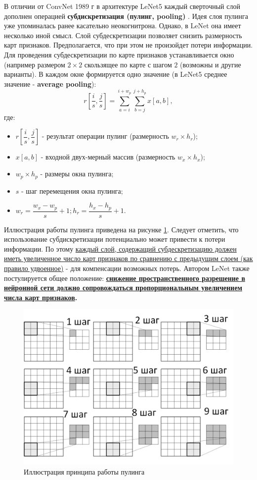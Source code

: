 \documentclass[12pt]{article}
\begin{document}
\begin{sloppypar}
В отличии от ConvNet 1989 г в архитектуре LeNet5 каждый сверточный слой дополнен операцией \textbf{субдискретизация (пулинг, pooling)} \cite{lecun1998gradient}. 
Идея слоя пулинга уже упоминалась ранее касательно неокогнитрона. Однако, в LeNet она имеет несколько иной смысл. Слой субдескретизации позволяет снизить размерность карт признаков. Предполагается, что при этом не произойдет потери информации. Для проведения субдескретизации по карте признаков устанавливается окно (например размером $2\times 2$ скользящее по карте с шагом $2$ (возможны и другие варианты). В каждом окне формируется одно значение (в LeNet5 среднее значение - \textbf{average pooling}):
\begin{equation}
    \label{ch1:eqn:av_pool}
    r\left[\frac{i}{s},\frac{j}{s}\right] = \sum_{a=i}^{i+w_p}\sum_{b=j}^{j+h_p}x[a,b],
\end{equation}
где:
\begin{itemize}
\itemsep 0em 
    \item $r\left[\dfrac{i}{s},\dfrac{j}{s}\right] $ - результат операции пулинг (размерность $w_r\times h_r$);
    \item $x[a,b]$ - входной двух-мерный массив (размерность $w_x\times h_x$);
    \item $w_p\times h_p$ - размеры окна пулинга;
    \item $s$ - шаг перемещения окна пулинга;
    \item $w_r = \dfrac{w_x - w_p}{s} + 1; h_r = \dfrac{h_x - h_p}{s} + 1$.
\end{itemize}

Иллюстрация работы пулинга приведена на рисунке \ref{ch1:fig:pooling}. Следует отметить, что использование субдискретизации потенциально может привести к потери информации. По этому \uline{каждый слой, содержащий субдескретизацию должен иметь увеличенное число карт признаков по сравнению с предыдущим слоем (как правило удвоенное)} - для компенсации возможных потерь. Автором LeNet также постулируется общее положение: \textbf{\uline{снижение пространственного разрешение в нейронной сети должно сопровождаться пропорциональным увеличением числа карт признаков}.}

\begin{figure}[h]
	\begin{center}
		\includegraphics[width=0.7\linewidth]{./figuresch1/pooling.png}
		\caption{Иллюстрация принципа работы пулинга}		
		\label{ch1:fig:pooling}
	\end{center}
\end{figure}


\end{sloppypar}
\end{document}

